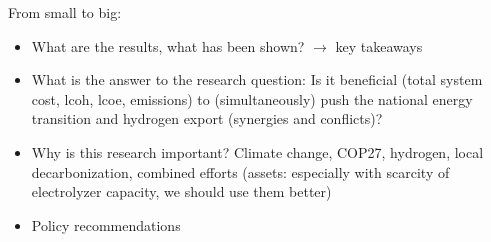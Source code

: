 From small to big:
\begin{itemize}
    \item What are the results, what has been shown? $\rightarrow$ key takeaways
    \item What is the answer to the research question: Is it beneficial (total system cost, lcoh, lcoe, emissions)
    to (simultaneously) push the national energy transition
    and hydrogen export (synergies and conflicts)?
    \item Why is this research important? Climate change, COP27, hydrogen, local decarbonization, combined efforts (assets: especially with scarcity of electrolyzer capacity, we should use them better)
    \item Policy recommendations
\end{itemize}
